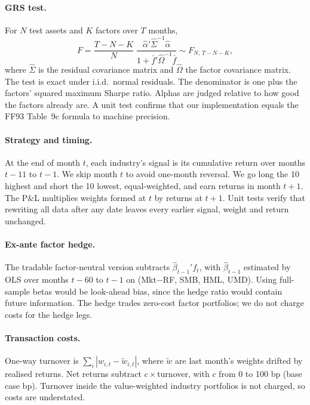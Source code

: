 \documentclass[11pt]{article}
\begin{document}
\paragraph{GRS test.} For $N$ test assets and $K$ factors over $T$ months,
\begin{equation}
F = \frac{T-N-K}{N}\;\frac{\hat\alpha'\hat\Sigma^{-1}\hat\alpha}{1+\bar f'\hat\Omega^{-1}\bar f} \sim F_{N,\,T-N-K},
\end{equation}
where $\hat\Sigma$ is the residual covariance matrix and $\hat\Omega$ the factor covariance matrix. The test is exact under i.i.d.\ normal residuals. The denominator is one plus the factors' squared maximum Sharpe ratio. Alphas are judged relative to how good the factors already are. A unit test confirms that our implementation equals the FF93 Table~9c formula to machine precision.

\paragraph{Strategy and timing.} At the end of month $t$, each industry's signal is its cumulative return over months $t-11$ to $t-1$. We skip month $t$ to avoid one-month reversal. We go long the 10 highest and short the 10 lowest, equal-weighted, and earn returns in month $t+1$. The P\&L multiplies weights formed at $t$ by returns at $t+1$. Unit tests verify that rewriting all data after any date leaves every earlier signal, weight and return unchanged.

\paragraph{Ex-ante factor hedge.} The tradable factor-neutral version subtracts $\hat\beta_{t-1}' f_t$, with $\hat\beta_{t-1}$ estimated by OLS over months $t-60$ to $t-1$ on (Mkt$-$RF, SMB, HML, UMD). Using full-sample betas would be look-ahead bias, since the hedge ratio would contain future information. The hedge trades zero-cost factor portfolios; we do not charge costs for the hedge legs.

\paragraph{Transaction costs.} One-way turnover is $\sum_i |w_{i,t} - \tilde w_{i,t}|$, where $\tilde w$ are last month's weights drifted by realised returns. Net returns subtract $c\times$turnover, with $c$ from 0 to 100 bp (base case \CostBps{} bp). Turnover inside the value-weighted industry portfolios is not charged, so costs are understated.
\end{document}
